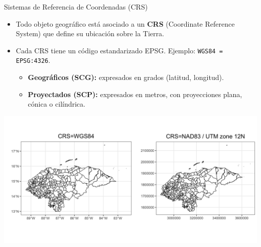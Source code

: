 \documentclass{beamer}
\begin{document}
\begin{frame}{Sistemas de Referencia de Coordenadas (CRS)}
\small
\begin{itemize}
    \item Todo objeto geográfico está asociado a un \textbf{CRS} (Coordinate Reference System) que define su ubicación sobre la Tierra.
    \item Cada CRS tiene un código estandarizado EPSG. Ejemplo: \texttt{WGS84 = EPSG:4326}.
    \begin{itemize}
        \item \textbf{Geográficos (SCG):} expresados en grados (latitud, longitud).
        \item \textbf{Proyectados (SCP):} expresados en metros, con proyecciones plana, cónica o cilíndrica.
    \end{itemize}
\end{itemize}
\vspace{-2.0em}
\centering
\includegraphics[width=1\linewidth]{figures/geographic_projected.png}
\end{frame}
\end{document}
